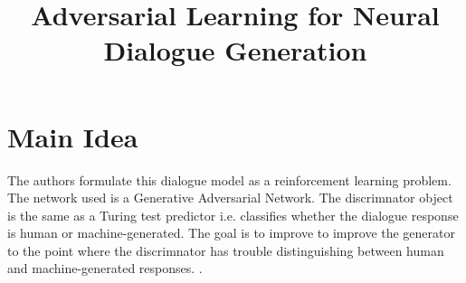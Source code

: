 \documentclass[12pt]{scrartcl}
\begin{document}
\title{Adversarial Learning for Neural Dialogue Generation}
\author{}
\date{}
\maketitle

\section{Main Idea}
  The authors formulate this dialogue model as a reinforcement learning problem. The network used is a Generative Adversarial Network. The discrimnator object is the same as a Turing test predictor i.e. classifies whether the dialogue response is human or machine-generated. The goal is to improve to improve the generator to the point where the discrimnator has trouble distinguishing between human and machine-generated responses. \cite{li2017adversarial}.
\end{document}
